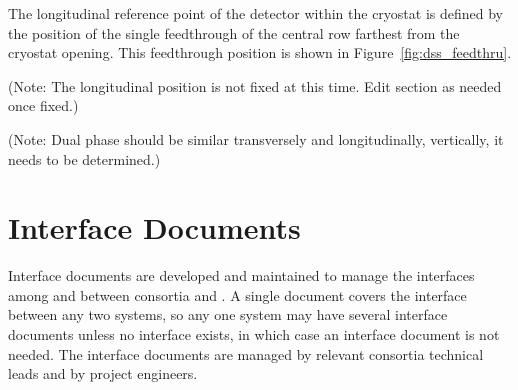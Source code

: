The longitudinal reference point of the detector within the cryostat
is defined by the position of the single feedthrough of the central row
farthest from the cryostat opening. This feedthrough position
is shown in Figure~\ref{fig:dss_feedthru}.




(Note: The longitudinal position is not fixed at this time. Edit
section as needed once fixed.)


(Note: Dual phase should be similar
transversely and longitudinally, vertically, it needs to be
determined.)




\section{Interface Documents}
\label{sec:fdsp-coord-integ-interface}


Interface documents are developed and maintained to manage
the interfaces among and between consortia and . A single document covers the interface between any two systems, so any one system may have several interface
documents unless no interface exists, in which case an interface document
is not needed. The interface documents are managed by relevant
consortia technical leads and by  project engineers.


